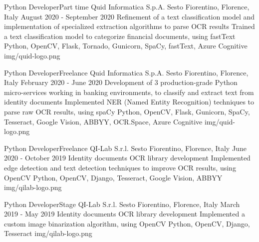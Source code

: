 
\begin{cventries}

  \logocventry
    {Python Developer{\enskip\cdotp\enskip}Part time}
    {Quid Informatica S.p.A.}
    {Sesto Fiorentino, Florence, Italy}
    {August 2020 - September 2020}
    {
      \cvexp
        {Refinement of a text classification model and implementation of specialized extraction algorithms to parse OCR results}
        {Trained a text classification model to categorize financial documents, using fastText}
        {Python, OpenCV, Flask, Tornado, Gunicorn, SpaCy, fastText, Azure Cognitive}
    }
    {img/quid-logo.png}

  \logocventry
    {Python Developer{\enskip\cdotp\enskip}Freelance}
    {Quid Informatica S.p.A.}
    {Sesto Fiorentino, Florence, Italy}
    {February 2020 - June 2020}
    {
      \cvexp
        {Development of 3 production-grade Python micro-services working in banking environments, to classify and extract text from identity documents}
        {Implemented NER (Named Entity Recognition) techniques to parse raw OCR results, using spaCy}
        {Python, OpenCV, Flask, Gunicorn, SpaCy, Tesseract, Google Vision, ABBYY, OCR.Space, Azure Cognitive}
    }
    {img/quid-logo.png}

  \logocventry
    {Python Developer{\enskip\cdotp\enskip}Freelance}
    {QI-Lab S.r.l.}
    {Sesto Fiorentino, Florence, Italy}
    {June 2020 - October 2019}
    {
      \cvexp
        {Identity documents OCR library development}
        {Implemented edge detection and text detection techniques to improve OCR results, using OpenCV}
        {Python, OpenCV, Django, Tesseract, Google Vision, ABBYY}
    }
    {img/qilab-logo.png}
  
  \logocventry
    {Python Developer{\enskip\cdotp\enskip}Stage}
    {QI-Lab S.r.l.}
    {Sesto Fiorentino, Florence, Italy}
    {March 2019 - May 2019}
    {
      \cvexp
        {Identity documents OCR library development}
        {Implemented a custom image binarization algorithm, using OpenCV}
        {Python, OpenCV, Django, Tesseract}
    }
    {img/qilab-logo.png}


\end{cventries}
